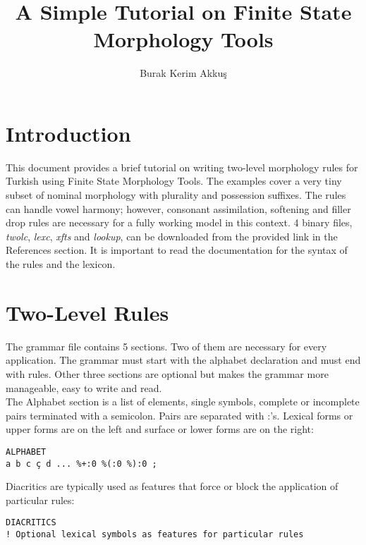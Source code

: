 \documentclass[11pt,a4paper]{article}
\begin{document}
\title{A Simple Tutorial on Finite State Morphology Tools}

\author{Burak Kerim Akkuş}

\date{}

\maketitle

\section{Introduction}
This document provides a brief tutorial on writing two-level morphology rules for Turkish using Finite State Morphology Tools. The examples cover a very tiny subset of nominal morphology with plurality and possession suffixes. The rules can handle vowel harmony; however, consonant assimilation, softening and filler drop rules are necessary for a fully working model in this context.
4 binary files, \textit{twolc}, \textit{lexc}, \textit{xfts} and \textit{lookup}, can be downloaded from the provided link in the References section. It is important to read the documentation for the syntax of the rules and the lexicon. 


\section{Two-Level Rules}

The grammar file contains 5 sections. Two of them are necessary for every application. The grammar must start with the alphabet declaration and must end with rules. Other three sections are optional but makes the grammar more manageable, easy to write and read.\\


The Alphabet section is a list of elements, single symbols, complete or incomplete pairs terminated with a semicolon. Pairs are separated with :'s. Lexical forms or upper forms are on the left and surface or lower forms are on the right: \\
\begin{lstlisting}[belowskip=1em,frame=single]
ALPHABET
a b c ç d ... %+:0 %(:0 %):0 ;

\end{lstlisting}

Diacritics are typically used as features that force or block the application of particular rules:\\
\begin{lstlisting}[belowskip=1em,frame=single]
DIACRITICS
! Optional lexical symbols as features for particular rules

\end{lstlisting}
\end{document}
